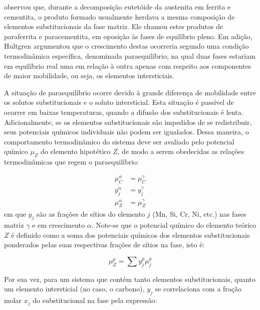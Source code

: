 
 observou que, durante a decomposição eutetóide da austenita em ferrita e cementita, o produto formado usualmente herdava a mesma composição de elementos substitucionais da fase matriz. Ele chamou estes produtos de paraferrita e paracementita, em oposição às fases de equilíbrio pleno. Em adição, Hultgren argumentou que o crescimento destas  ocorreria segundo uma condição termodinâmica específica, denominada paraequilíbrio, na qual duas fases estariam em equilíbrio real uma em relação à outra apenas com respeito aos componentes de maior mobilidade, ou seja, os elementos intersticiais.

A situação de paraequilíbrio ocorre devido à grande diferença de mobilidade entre os solutos substitucionais e o soluto intersticial. Esta situação é passível de ocorrer em baixas temperaturas, quando a difusão dos substitucionais é lenta\cite{Hillert2006}. Adicionalmente, se os elementos substitucionais são impedidos de se redistribuir, seus potenciais químicos individuais não podem ser igualados. Dessa maneira, o comportamento termodinâmico do sistema deve ser avaliado pelo potencial químico $\mu_Z$ do elemento hipotético $Z$\cite{Ghosh2001}, de modo a serem obedecidas as relações termodinâmicas que regem o paraequilíbrio:

\begin{subequations}
  \begin{align}
    \mu_C^\alpha &= \mu_C^\gamma \label{eq:potQuimC}\\
    y_j^\alpha &= y_j^\gamma \label{eq:fracSitios}\\
    \mu_Z^\alpha &= \mu_Z^\gamma \label{eq:potQuimZ}
  \end{align}
\end{subequations}
%
em que $y_j$ são as frações de sítios do elemento $j$ (Mn, Si, Cr, Ni, etc.) nas fases matriz $\gamma$ e em crescimento $\alpha$. Note-se que o potencial químico do elemento teórico $Z$ é definido como a soma dos potenciais químicos dos elementos substitucionais ponderados pelas suas respectivas frações de sítios na fase, isto é:

\begin{equation}
  \mu_Z^p = \sum y_j^p \mu_j^p
\end{equation}

Por sua vez, para um sistema que contém tanto elementos substitucionais, quanto um elemento intersticial (no caso, o carbono), $y_j$ se correlaciona com a fração molar $x_j$ do substitucional na fase pela expressão:

